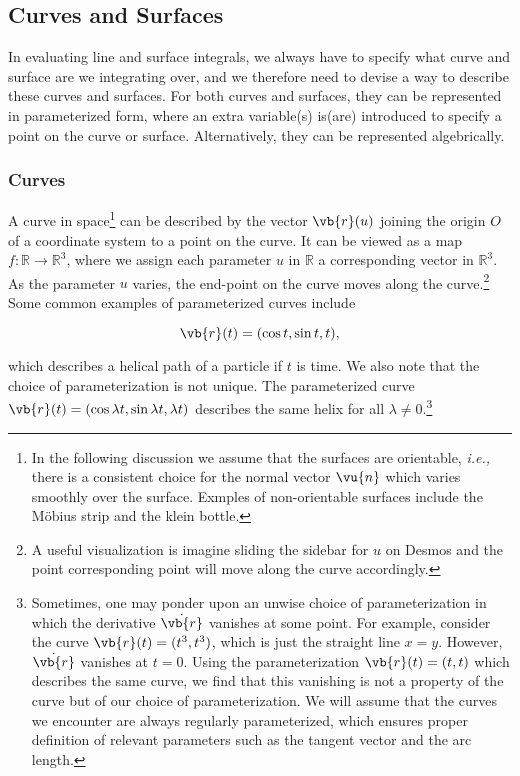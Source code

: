 \documentclass[english,a4paper,12pt]{report}
\begin{document}
\subsection{Curves and Surfaces}

In evaluating line and surface integrals, we always have to specify what curve and surface are we integrating over, and we therefore need to devise a way to describe these curves and surfaces. For both curves and surfaces, they can be represented in parameterized form, where an extra variable(s) is(are) introduced to specify a point on the curve or surface. Alternatively, they can be represented algebrically.

\subsubsection{Curves}

A curve in space\footnote{In the following discussion we assume that the surfaces are orientable, \textit{i.e.,} there is a consistent choice for the normal vector \(\vu{n} \) which varies smoothly over the surface. Exmples of non-orientable surfaces include the Möbius strip and the klein bottle.} can be described by the vector \(\vb{r} (u)\) joining the origin \(O\) of a coordinate system to a point on the curve. It can be viewed as a map\(f: \mathbb{R} \to \mathbb{R}^{3} \), where we assign each parameter \(u\) in \(\mathbb{R}\) a corresponding vector in \(\mathbb{R}^{3} \).  As the parameter \(u\) varies, the end-point on the curve moves along the curve.\footnote{A useful visualization is imagine sliding the sidebar for \(u\) on Desmos and the point corresponding point will move along the curve accordingly.} Some common examples of parameterized curves include

\begin{equation}
	\vb{r} (t) = (\cos t, \sin t, t), 
\end{equation}

which describes a helical path of a particle if \(t\) is time. We also note that the choice of parameterization is not unique. The parameterized curve \(\vb{r} (t) = (\cos \lambda t, \sin \lambda t, \lambda t)\) describes the same helix for all \(\lambda \neq 0\).\footnote{Sometimes, one may ponder upon an unwise choice of parameterization in which the derivative \(\dot{\vb{r} } \) vanishes at some point. For example, consider the curve \(\vb{r} (t) = (t^3 ,t^3 )\), which is just the straight line \(x=y\). However, \(\dot{\vb{r} } \) vanishes at \(t=0\). Using the parameterization \(\vb{r} (t) = (t,t)\) which describes the same curve, we find that this vanishing is not a property of the curve but of our choice of parameterization. We will assume that the curves we encounter are always regularly parameterized, which ensures proper definition of relevant parameters such as the tangent vector and the arc length.}  
\end{document}
